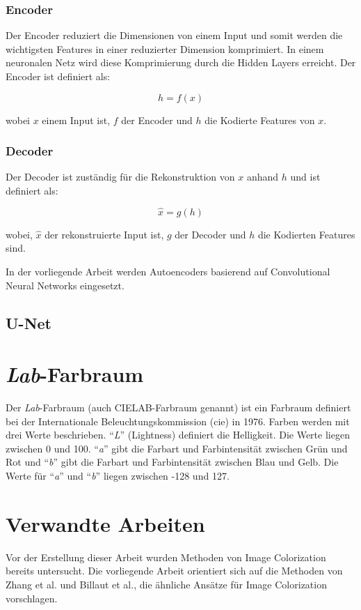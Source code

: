 \subsubsection{Encoder}
Der Encoder reduziert die Dimensionen von einem Input und somit werden die wichtigsten Features in einer reduzierter Dimension komprimiert.
In einem neuronalen Netz wird diese Komprimierung durch die Hidden Layers erreicht. Der Encoder ist definiert als:

\begin{equation}
  h = f(x)
\end{equation}

wobei $x$ einem Input ist, $f$ der Encoder und $h$ die Kodierte Features von $x$.

\subsubsection{Decoder}
Der Decoder ist zuständig für die Rekonstruktion von $x$ anhand $h$ und ist definiert als:

\begin{equation}
  \hat{x} = g(h)
\end{equation}

wobei, $\hat{x}$ der rekonstruierte Input ist, $g$ der Decoder und $h$ die Kodierten Features sind.

In der vorliegende Arbeit werden Autoencoders basierend auf Convolutional Neural Networks eingesetzt.

\subsection{U-Net}


\section{\textit{Lab}-Farbraum} 
Der \textit{Lab}-Farbraum (auch CIELAB-Farbraum genannt) ist ein Farbraum definiert bei der Internationale
Beleuchtungskommission (\gls{cie}) in 1976. Farben werden mit drei Werte beschrieben. ``\textit{L}'' (Lightness) definiert die Helligkeit.
Die Werte liegen zwischen 0 und 100. ``\textit{a}'' gibt die Farbart und Farbintensität zwischen Grün und Rot und ``\textit{b}'' gibt die
Farbart und Farbintensität zwischen Blau und Gelb. Die Werte für ``\textit{a}'' und ``\textit{b}'' liegen zwischen -128 und 127.


\section{Verwandte Arbeiten}
Vor der Erstellung dieser Arbeit wurden Methoden von Image Colorization bereits untersucht. Die vorliegende Arbeit orientiert sich auf die 
Methoden von Zhang et al. und Billaut et al., die ähnliche Ansätze für Image Colorization vorschlagen.